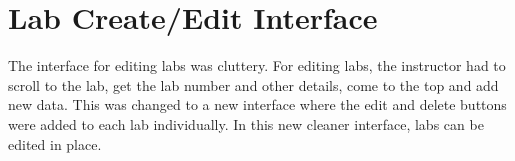 \section{Lab Create/Edit Interface}
The interface for editing labs was cluttery. For editing labs, the instructor had to scroll to the lab, get the lab number and other details, come to the top and add new data. This was changed to a new interface where the edit and delete buttons were added to each lab individually. In this new cleaner interface, labs can be edited in place.